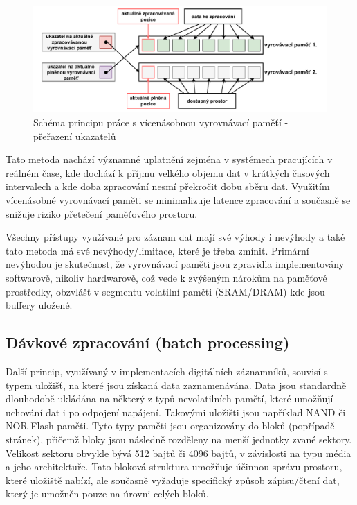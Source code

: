 \begin{figure}[h]
    \centering
    \includegraphics[width=1.00\textwidth]{obrazky-figures/multiple_buffering-2.pdf}
    
    \caption{Schéma principu práce s vícenásobnou vyrovnávací paměťí - přeřazení ukazatelů}
    \label{fig:multiple-buffering-2}
\end{figure}

Tato metoda nachází významné uplatnění zejména v systémech pracujících v reálném čase, kde dochází k příjmu velkého objemu dat v krátkých časových intervalech a kde doba zpracování nesmí překročit dobu sběru dat. Využitím vícenásobné vyrovnávací paměti se minimalizuje latence zpracování a současně se snižuje riziko přetečení paměťového prostoru. \cite{buffering_chang}

Všechny přístupy využívané pro záznam dat mají své výhody i nevýhody a také tato metoda má své nevýhody/limitace, které je třeba zmínit. Primární nevýhodou je skutečnost, že vyrovnávací paměti jsou zpravidla implementovány softwarově, nikoliv hardwarově, což vede k zvýšeným nárokům na paměťové prostředky, obzvlášť v segmentu volatilní paměti (SRAM/DRAM) kde jsou buffery uložené. \cite{basics_of_digital_forensics}

\subsection{Dávkové zpracování (batch processing)}
\label{davkove_zpracovani}
Další princip, využívaný v implementacích digitálních záznamníků, souvisí s typem uložišť, na které jsou získaná data zaznamenávána. Data jsou standardně dlouhodobě ukládána na některý z typů nevolatilních pamětí, které umožňují uchování dat i po odpojení napájení. Takovými uložišti jsou například NAND či NOR Flash paměti. Tyto typy paměti jsou organizovány do bloků (popřípadě stránek), přičemž bloky jsou následně rozděleny na menší jednotky zvané sektory. Velikost sektoru obvykle bývá 512 bajtů či 4096 bajtů, v závislosti na typu média a jeho architektuře. Tato bloková struktura umožňuje účinnou správu prostoru, které uložiště nabízí, ale současně vyžaduje specifický způsob zápisu/čtení dat, který je umožněn pouze na úrovni celých bloků. \cite{tech_target_nand_flash, non_volatile_memories}

